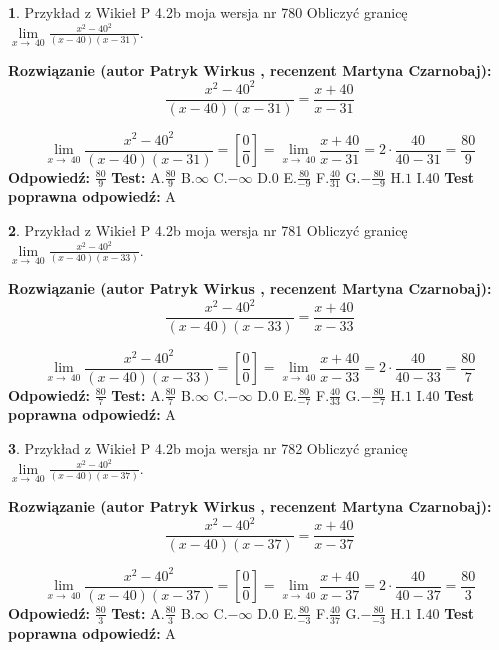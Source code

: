 \documentclass[12pt, a4paper]{article}
\theoremstyle{definition} %
\newtheorem{zad}{}
\newcommand{\zadStart}[1]{\begin{zad}#1\newline}
\newcommand{\zadStop}{\end{zad}}
\newcommand{\rozwStart}[2]{\noindent \textbf{Rozwiązanie (autor #1 , recenzent #2): }\newline}
\newcommand{\rozwStop}{\newline}
\newcommand{\odpStart}{\noindent \textbf{Odpowiedź:}\newline}
\newcommand{\odpStop}{\newline}
\newcommand{\testStart}{\noindent \textbf{Test:}\newline}
\newcommand{\testStop}{\newline}
\newcommand{\kluczStart}{\noindent \textbf{Test poprawna odpowiedź:}\newline}
\newcommand{\kluczStop}{\newline}
\begin{document}
\zadStart{Przykład z Wikieł P 4.2b moja wersja nr 780}
Obliczyć granicę $\lim\limits_{x\to\ 40}\frac{x^{2}-40^{2}}{(x-40)(x-31)}$.
\zadStop
\rozwStart{Patryk Wirkus}{Martyna Czarnobaj}
$$\frac{x^{2}-40^{2}}{(x-40)(x-31)}=\frac{x+40}{x-31}$$

$$\lim\limits_{x\to\ 40}\frac{x^{2}-40^{2}}{(x-40)(x-31)}=[\frac{0}{0}]=\lim\limits_{x\to\ 40}\frac{x+40}{x-31}=2 \cdot \frac{40}{40-31} = \frac{80}{9}$$
\rozwStop
\odpStart
$\frac{80}{9}$
\odpStop
\testStart
A.$\frac{80}{9}$
B.$\infty$
C.$-\infty$
D.$0$
E.$\frac{80}{-9}$
F.$\frac{40}{31}$
G.$-\frac{80}{-9}$
H.$1$
I.$40$
\testStop
\kluczStart
A
\kluczStop



\zadStart{Przykład z Wikieł P 4.2b moja wersja nr 781}
Obliczyć granicę $\lim\limits_{x\to\ 40}\frac{x^{2}-40^{2}}{(x-40)(x-33)}$.
\zadStop
\rozwStart{Patryk Wirkus}{Martyna Czarnobaj}
$$\frac{x^{2}-40^{2}}{(x-40)(x-33)}=\frac{x+40}{x-33}$$

$$\lim\limits_{x\to\ 40}\frac{x^{2}-40^{2}}{(x-40)(x-33)}=[\frac{0}{0}]=\lim\limits_{x\to\ 40}\frac{x+40}{x-33}=2 \cdot \frac{40}{40-33} = \frac{80}{7}$$
\rozwStop
\odpStart
$\frac{80}{7}$
\odpStop
\testStart
A.$\frac{80}{7}$
B.$\infty$
C.$-\infty$
D.$0$
E.$\frac{80}{-7}$
F.$\frac{40}{33}$
G.$-\frac{80}{-7}$
H.$1$
I.$40$
\testStop
\kluczStart
A
\kluczStop



\zadStart{Przykład z Wikieł P 4.2b moja wersja nr 782}
Obliczyć granicę $\lim\limits_{x\to\ 40}\frac{x^{2}-40^{2}}{(x-40)(x-37)}$.
\zadStop
\rozwStart{Patryk Wirkus}{Martyna Czarnobaj}
$$\frac{x^{2}-40^{2}}{(x-40)(x-37)}=\frac{x+40}{x-37}$$

$$\lim\limits_{x\to\ 40}\frac{x^{2}-40^{2}}{(x-40)(x-37)}=[\frac{0}{0}]=\lim\limits_{x\to\ 40}\frac{x+40}{x-37}=2 \cdot \frac{40}{40-37} = \frac{80}{3}$$
\rozwStop
\odpStart
$\frac{80}{3}$
\odpStop
\testStart
A.$\frac{80}{3}$
B.$\infty$
C.$-\infty$
D.$0$
E.$\frac{80}{-3}$
F.$\frac{40}{37}$
G.$-\frac{80}{-3}$
H.$1$
I.$40$
\testStop
\kluczStart
A
\kluczStop
\end{document}
